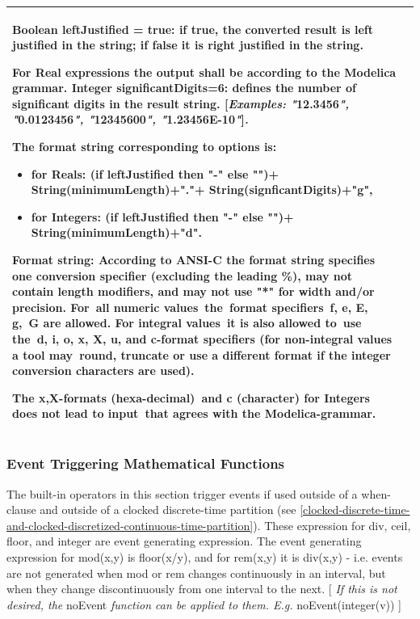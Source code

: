 \documentclass[10pt,a4paper]{report}
\renewcommand{\newline}{\hspace*{\fill}\raggedright\linebreak}
\renewcommand{\newline}{\hspace*{\fill}\linebreak}
\def\doublelabel#1{\label{#1}}
\begin{document}
\begin{longtable}{|p{4.5cm}|p{10.5cm}|}
Boolean leftJustified = true: if true, the converted result is left
justified in the string; if false it is right justified in the string.

For Real expressions the output shall be according to the Modelica
grammar. Integer significantDigits=6: defines the number of significant
digits in the result string. {[}\emph{Examples: "}12.3456\emph{",
"}0.0123456\emph{", "}12345600\emph{", "}1.23456E-10\emph{"}{]}\emph{.}

The format string corresponding to options is:

\begin{itemize}
\item
  for Reals: \newline
  (if leftJustified then "-" else "")+\newline
  String(minimumLength)+"."+\newline
  String(signficantDigits)+"g",
\item
  for Integers: \newline
  (if leftJustified then "-" else "")+\newline
  String(minimumLength)+"d".
\end{itemize}

Format string: According to ANSI-C the format string specifies one
conversion specifier (excluding the leading \%), may not contain length
modifiers, and may not use "*" for width and/or precision. For~all
numeric values~the~format specifiers~f, e, E, g,~G are allowed. For
integral values~it is also allowed to~use the~d, i, o, x, X, u, and
c-format specifiers (for non-integral values a tool may~round, truncate
or use a different format if the integer conversion characters are
used).

The x,X-formats (hexa-decimal)~and c (character) for Integers does not
lead to input~that agrees with the Modelica-grammar.\\ \hline
\end{longtable}

\subsubsection{Event Triggering Mathematical Functions}\doublelabel{event-triggering-mathematical-functions}

The built-in operators in this section trigger events if used outside of
a when-clause and outside of a clocked discrete-time partition (see
\ref{clocked-discrete-time-and-clocked-discretized-continuous-time-partition}). 
These expression for div, ceil, floor, and integer are
event generating expression. The event generating expression for
mod(x,y) is floor(x/y), and for rem(x,y) it is div(x,y) - i.e. events
are not generated when mod or rem changes continuously in an interval,
  but when they change discontinuously from one interval to the next. {[}
\emph{If this is not desired, the} noEvent \emph{function can be applied
to them. E.g.} noEvent(integer(v)) {]}
\end{document}
